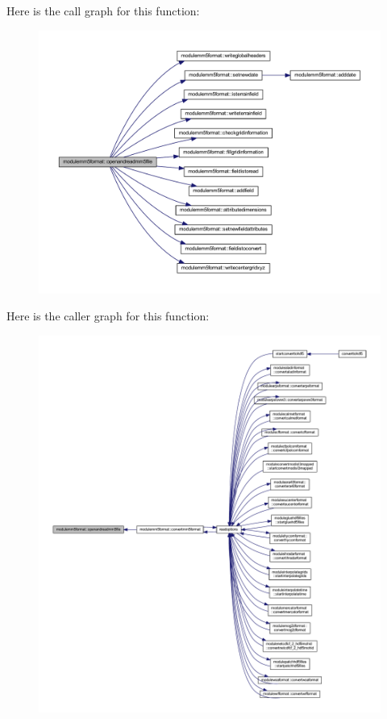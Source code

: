 Here is the call graph for this function\+:\nopagebreak
\begin{figure}[H]
\begin{center}
\leavevmode
\includegraphics[width=350pt]{namespacemodulemm5format_a4a978d934b39be4e1dd62a5701e05c93_cgraph}
\end{center}
\end{figure}
Here is the caller graph for this function\+:\nopagebreak
\begin{figure}[H]
\begin{center}
\leavevmode
\includegraphics[width=350pt]{namespacemodulemm5format_a4a978d934b39be4e1dd62a5701e05c93_icgraph}
\end{center}
\end{figure}
\mbox{\label{namespacemodulemm5format_a1f3cc8db72c3a71a34ba6b95a7658651}} 
